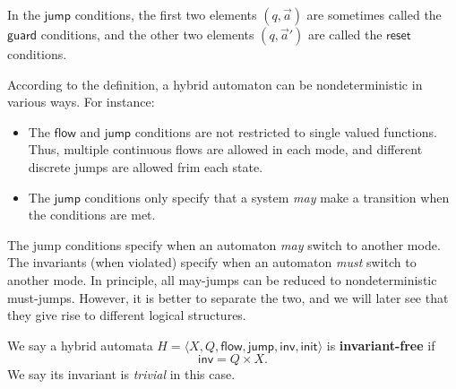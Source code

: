 \documentclass[envcountsect]{llncs}
\newcommand{\flow}{\mathsf{flow}}
\newcommand{\jump}{\mathsf{jump}}
\newcommand{\inv}{\mathsf{inv}}
\newcommand{\init}{\mathsf{init}}
\newcommand{\guard}{\mathsf{guard}}
\newcommand{\reset}{\mathsf{reset}}
\begin{document}

\begin{remark}[$\guard$ and $\reset$]
In the $\jump$ conditions, the first two elements $(q, \vec a)$ are sometimes 
called the $\guard$ conditions, and the other two elements $(q, \vec a')$ are
called the $\reset$ conditions. 
\end{remark}

\begin{remark}[Nondeterminism]
According to the definition, a hybrid automaton can be nondeterministic in
various ways.  For instance: 
\begin{itemize}
\item The $\flow$ and $\jump$ conditions are not restricted to single valued
functions.  Thus, multiple continuous flows are allowed in each mode, and
different discrete jumps are allowed frim each state. 
\item The $\jump$ conditions only specify that a system {\em may} make a
transition  when the conditions are met. 
\end{itemize}
\end{remark}

\begin{remark}[$\jump$ vs $\inv$] The jump conditions specify when an automaton
{\em may}  switch to another mode. The invariants (when violated) specify when
an automaton {\em must} switch to another mode. In principle, all may-jumps can
be reduced to nondeterministic must-jumps. However, it is better to separate the
two, and we will later see that they give rise to different logical structures. 
\end{remark}

\begin{definition}
We say a hybrid automata $H = \langle X, Q, \flow, \jump, \inv, \init\rangle$ is
 {\bf invariant-free} if $$\inv = Q\times X.$$ 
We say its invariant is {\em trivial} in this case.  
\end{definition}
\end{document}
